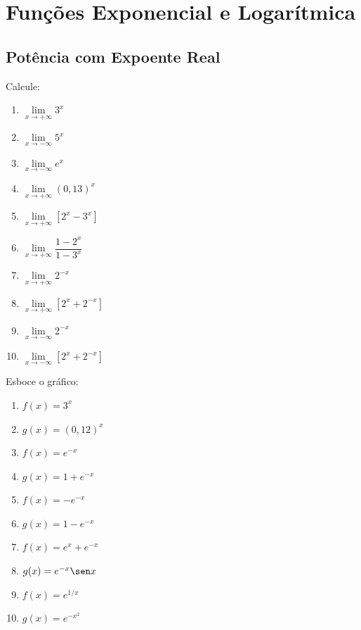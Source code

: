 \setcounter{section}{5}
\setcounter{subsection}{0}

\section{Funções Exponencial e Logarítmica}

\subsection{Potência com Expoente Real}

\begin{exercicio}[1]
Calcule:
\begin{enumerate}[label=\alph*)]
    \item $\lim\limits_{x \to +\infty} 3^x$
    \item $\lim\limits_{x \to -\infty} 5^x$
    \item $\lim\limits_{x \to -\infty} e^x$
    \item $\lim\limits_{x \to +\infty} (0{,}13)^x$
    \item $\lim\limits_{x \to +\infty} [2^x - 3^x]$
    \item $\lim\limits_{x \to +\infty} \dfrac{1 - 2^x}{1 - 3^x}$
    \item $\lim\limits_{x \to +\infty} 2^{-x}$
    \item $\lim\limits_{x \to +\infty} [2^x + 2^{-x}]$
    \item $\lim\limits_{x \to -\infty} 2^{-x}$
    \item $\lim\limits_{x \to -\infty} [2^x + 2^{-x}]$
\end{enumerate}
\end{exercicio}

\begin{exercicio}[2]
Esboce o gráfico:
\begin{enumerate}[label=\alph*)]
    \item $f(x) = 3^x$
    \item $g(x) = (0{,}12)^x$
    \item $f(x) = e^{-x}$
    \item $g(x) = 1 + e^{-x}$
    \item $f(x) = -e^{-x}$
    \item $g(x) = 1 - e^{-x}$
    \item $f(x) = e^x + e^{-x}$
    \item $g(x) = e^{-x}\sen x$
    \item $f(x) = e^{1/x}$
    \item $g(x) = e^{-x^2}$
\end{enumerate}
\end{exercicio}

